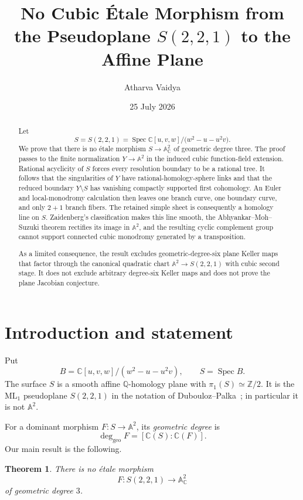 \documentclass[11pt]{article}
\title{No Cubic \'Etale Morphism from the Pseudoplane
\(S(2,2,1)\) to the Affine Plane}
\author{Atharva Vaidya}
\date{25 July 2026}
\newtheorem{theorem}{Theorem}[section]
\theoremstyle{definition}
\theoremstyle{remark}
\newcommand{\A}{\mathbb A}
\newcommand{\C}{\mathbb C}
\newcommand{\Q}{\mathbb Q}
\newcommand{\Z}{\mathbb Z}
\newcommand{\Spec}{\operatorname{Spec}}
\begin{document}
\maketitle

\begin{abstract}
Let
\[
 S=S(2,2,1)=
 \Spec\C[u,v,w]/\bigl(w^2-u-u^2v\bigr).
\]
We prove that there is no \'etale morphism
\(S\to\A^2_\C\) of geometric degree three.  The proof passes to the
finite normalization \(Y\to\A^2\) in the induced cubic function-field
extension.  Rational acyclicity of \(S\) forces every resolution boundary
to be a rational tree.  It follows that the singularities of \(Y\) have
rational-homology-sphere links and that the reduced boundary
\(Y\setminus S\) has vanishing compactly supported first cohomology.
An Euler and local-monodromy calculation then leaves one branch curve,
one boundary curve, and only \(2+1\) branch fibers.  The retained simple
sheet is consequently a homology line on \(S\).  Zaidenberg's
classification makes this line smooth, the
Abhyankar--Moh--Suzuki theorem rectifies its image in \(\A^2\), and the
resulting cyclic complement group cannot support connected cubic
monodromy generated by a transposition.

As a limited consequence, the result excludes geometric-degree-six
plane Keller maps that factor through the canonical quadratic chart
\(\A^2\to S(2,2,1)\) with cubic second stage.  It does not exclude
arbitrary degree-six Keller maps and does not prove the plane Jacobian
conjecture.
\end{abstract}

\section{Introduction and statement}

Put
\[
 B=\C[u,v,w]/(w^2-u-u^2v),\qquad S=\Spec B.
\]
The surface \(S\) is a smooth affine \(\Q\)-homology plane with
\(\pi_1(S)\simeq\Z/2\).  It is the \(\mathrm{ML}_1\) pseudoplane
\(S(2,2,1)\) in the notation of
Dubouloz--Palka~\cite{DuboulozPalka}; in particular it is not
\(\A^2\).

For a dominant morphism \(F:S\to\A^2\), its \emph{geometric degree} is
\[
 \deg_{\mathrm{geo}}F
 =[\C(S):\C(F)].
\]
Our main result is the following.

\begin{theorem}\label{thm:main}
There is no \'etale morphism
\[
 F:S(2,2,1)\longrightarrow\A^2_\C
\]
of geometric degree \(3\).
\end{theorem}
\end{document}
